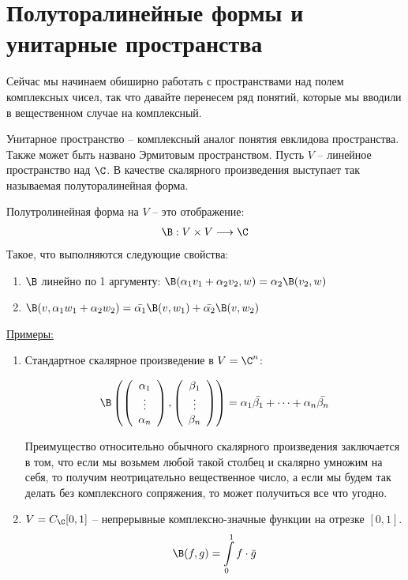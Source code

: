 \section{Полуторалинейные формы и унитарные пространства}
Сейчас мы начинаем обиширно работать с пространствами над полем комплексных чисел, так что 
давайте перенесем ряд понятий, которые мы вводили в вещественном случае на комплексный. 

Унитарное пространство -- комплексный аналог понятия евклидова пространства. Также может быть названо 
Эрмитовым пространством. Пусть $V$ -- линейное пространство над $\C$. В качестве скалярного произведения выступает так 
называемая полуторалинейная форма. 

\begin{conj}
    Полутролинейная форма на $V$ -- это отображение: 
    \begin{gather*}
        \B: V \times V \longrightarrow \C
    \end{gather*}
    Такое, что выполняются следующие свойства: 
    \begin{enumerate}
        \item $\B$ линейно по 1 аргументу: $\B(\alpha_1 v_1 + \alpha_2 v_2, w) = \alpha_2 \B(v_2, w)$
        \item $\B(v, \alpha_1 w_1 + \alpha_2 w_2) = \bar{\alpha_1} \B(v, w_1) + \bar{\alpha_2}\B(v, w_2)$
    \end{enumerate}
    \underline{Примеры:}
    \begin{enumerate}
        \item Стандартное скалярное произведение в $V = \C^n$:
        
        \begin{gather*}
            \B\left(\left(\begin{array}{c}
            \alpha_1 \\ 
            \vdots \\ 
            \alpha_n
            \end{array}\right), 
            \left(\begin{array}{c}
            \beta_1 \\ 
            \vdots \\ 
            \beta_n
            \end{array}\right)\right) 
            = \alpha_1 \bar{\beta_1} + \dots + \alpha_n \bar{\beta_n}
        \end{gather*}

        Преимущество относительно обычного скалярного произведения заключается в том, что если мы возьмем любой такой столбец и
        скалярно умножим на себя, то получим неотрицательно вещественное число, а если мы будем так делать без комплексного 
        сопряжения, то может получиться все что угодно.

        \item $V = C_{\C} [0, 1]$ -- непрерывные комплексно-значные функции на отрезке $[0, 1]$.
        \begin{gather*}
            \B(f, g) = \int\limits_0^1 f \cdot \bar{g}
        \end{gather*}
    \end{enumerate}    
\end{conj}

